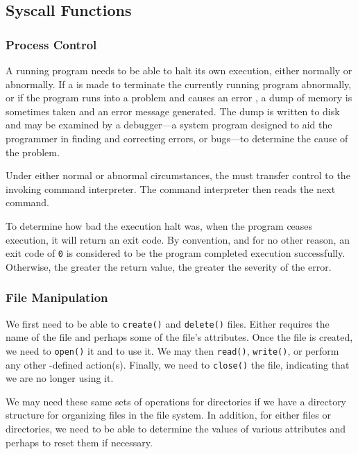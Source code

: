 \subsection{Syscall Functions}\label{subsec:Syscall_Functions}
\subsubsection{Process Control}\label{subsubsec:Process_Control}
A running program needs to be able to halt its own execution, either normally or abnormally.
If a  is made to terminate the currently running program abnormally, or if the program runs into a problem and causes an error , a dump of memory is sometimes taken and an error message generated.
The dump is written to disk and may be examined by a debugger—a system program designed to aid the programmer in finding and correcting errors, or bugs—to determine the cause of the problem.

Under either normal or abnormal circumstances, the  must transfer control to the invoking command interpreter.
The command interpreter then reads the next command.

To determine how bad the execution halt was, when the program ceases execution, it will return an exit code.
By convention, and for no other reason, an exit code of \texttt{0} is considered to be the program completed execution successfully.
Otherwise, the greater the return value, the greater the severity of the error.

\subsubsection{File Manipulation}\label{subsubsec:File_Manipulation}
We first need to be able to \texttt{create()} and \texttt{delete()} files.
Either  requires the name of the file and perhaps some of the file’s attributes.
Once the file is created, we need to \texttt{open()} it and to use it.
We may then \texttt{read()}, \texttt{write()}, or perform any other -defined action(s).
Finally, we need to \texttt{close()} the file, indicating that we are no longer using it.

We may need these same sets of operations for directories if we have a directory structure for organizing files in the file system.
In addition, for either files or directories, we need to be able to determine the values of various attributes and perhaps to reset them if necessary.

